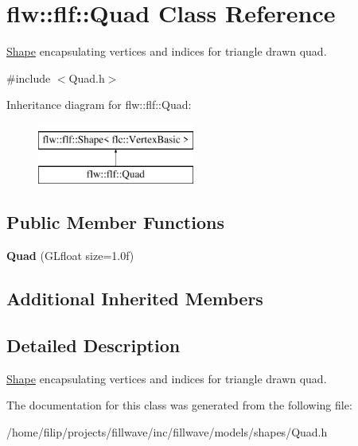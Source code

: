 \hypertarget{classflw_1_1flf_1_1Quad}{}\section{flw\+:\+:flf\+:\+:Quad Class Reference}
\label{classflw_1_1flf_1_1Quad}


\hyperlink{classflw_1_1flf_1_1Shape}{Shape} encapsulating vertices and indices for triangle drawn quad.  




{\ttfamily \#include $<$Quad.\+h$>$}

Inheritance diagram for flw\+:\+:flf\+:\+:Quad\+:\begin{figure}[H]
\begin{center}
\leavevmode
\includegraphics[height=2.000000cm]{classflw_1_1flf_1_1Quad}
\end{center}
\end{figure}
\subsection*{Public Member Functions}
\begin{DoxyCompactItemize}
\item 
\mbox{\label{classflw_1_1flf_1_1Quad_a34f140e3bdad89dfb40242c0c09a0fda}} 
{\bfseries Quad} (G\+Lfloat size=1.\+0f)
\end{DoxyCompactItemize}
\subsection*{Additional Inherited Members}


\subsection{Detailed Description}
\hyperlink{classflw_1_1flf_1_1Shape}{Shape} encapsulating vertices and indices for triangle drawn quad. 

The documentation for this class was generated from the following file\+:\begin{DoxyCompactItemize}
\item 
/home/filip/projects/fillwave/inc/fillwave/models/shapes/Quad.\+h\end{DoxyCompactItemize}
